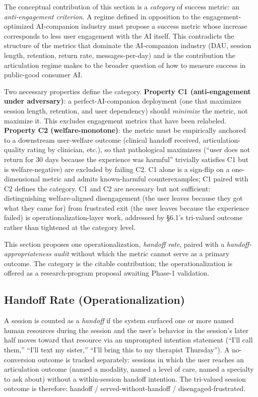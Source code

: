 \documentclass[letterpaper]{article}
\begin{document}
The conceptual contribution of this section is a \emph{category} of success metric: an \emph{anti-engagement criterion}. A regime defined in opposition to the engagement-optimized AI-companion industry must propose a success metric whose increase corresponds to less user engagement with the AI itself. This contradicts the structure of the metrics that dominate the AI-companion industry (DAU, session length, retention, return rate, messages-per-day) and is the contribution the articulation regime makes to the broader question of how to measure success in public-good consumer AI.

Two necessary properties define the category. \textbf{Property C1 (anti-engagement under adversary)}: a perfect-AI-companion deployment (one that maximizes session length, retention, and user dependency) should \emph{minimize} the metric, not maximize it. This excludes engagement metrics that have been relabeled. \textbf{Property C2 (welfare-monotone)}: the metric must be empirically anchored to a downstream user-welfare outcome (clinical handoff received, articulation-quality rating by clinician, etc.), so that pathological maximizers (``user does not return for 30 days because the experience was harmful'' trivially satisfies C1 but is welfare-negative) are excluded by failing C2. C1 alone is a sign-flip on a one-dimensional metric and admits known-harmful counterexamples; C1 paired with C2 defines the category. C1 and C2 are necessary but not sufficient: distinguishing welfare-aligned disengagement (the user leaves because they got what they came for) from frustrated exit (the user leaves because the experience failed) is operationalization-layer work, addressed by \S6.1's tri-valued outcome rather than tightened at the category level.

This section proposes one operationalization, \emph{handoff rate}, paired with a \emph{handoff-appropriateness audit} without which the metric cannot serve as a primary outcome. The category is the citable contribution; the operationalization is offered as a research-program proposal awaiting Phase-1 validation.

\subsection{Handoff Rate (Operationalization)}

A session is counted as a \emph{handoff} if the system surfaced one or more named human resources during the session and the user's behavior in the session's later half moves toward that resource via an unprompted intention statement (``I'll call them,'' ``I'll text my sister,'' ``I'll bring this to my therapist Thursday''). A no-conversion outcome is tracked separately: sessions in which the user reaches an articulation outcome (named a modality, named a level of care, named a specialty to ask about) without a within-session handoff intention. The tri-valued session outcome is therefore: handoff / served-without-handoff / disengaged-frustrated.
\end{document}
